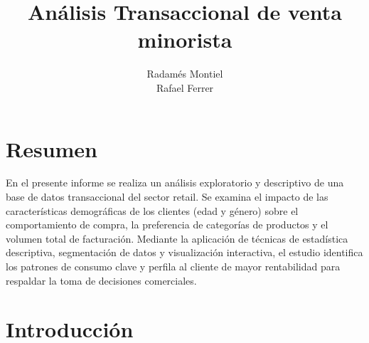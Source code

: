\documentclass[oneside,11pt]{Latex/Classes/PhDthesisPSnPDF}
\title{Análisis Transaccional de venta minorista}
\author{Radamés Montiel \\ Rafael Ferrer}
\begin{document}
\maketitle

\frontmatter


\setcounter{secnumdepth}{3}
\setcounter{tocdepth}{3}

\tableofcontents



\cleardoublepage

  \cleardoublepage       %
  \chapter*{Resumen}     %
  
  En el presente informe se realiza un análisis exploratorio y
descriptivo de una base de datos transaccional del sector retail. Se
examina el impacto de las características demográficas de los clientes
(edad y género) sobre el comportamiento de compra, la preferencia de
categorías de productos y el volumen total de facturación. Mediante la
aplicación de técnicas de estadística descriptiva, segmentación de datos
y visualización interactiva, el estudio identifica los patrones de
consumo clave y perfila al cliente de mayor rentabilidad para respaldar
la toma de decisiones
comerciales.             %
  
  \cleardoublepage

\mainmatter
\def\baselinestretch{1.5}

\chapter*{Introducción}
\end{document}
